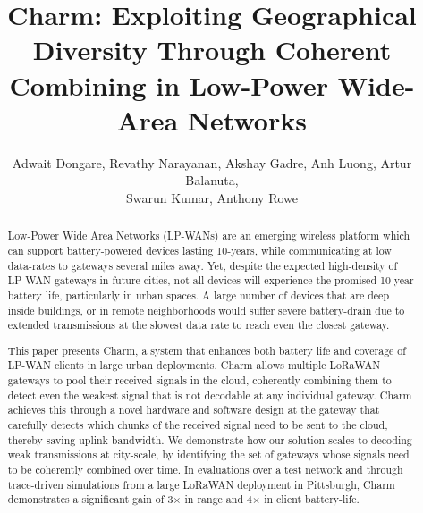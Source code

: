 \documentclass[sigconf]{acmart}
\title{Charm: Exploiting Geographical Diversity Through Coherent Combining in
Low-Power Wide-Area Networks}
\author{Adwait Dongare,
		Revathy Narayanan,
		Akshay Gadre,
		Anh Luong,
		Artur Balanuta,\\
		Swarun Kumar,
		Anthony Rowe}
\affiliation{%
 \institution{Carnegie Mellon University}
 \department{Electrical and Computer Engineering}
 \city{Pittsburgh} 
 \state{Pennsylvania} 
}
\begin{document}
\begin{abstract}


Low-Power Wide Area Networks (LP-WANs) are an emerging wireless platform which
can support battery-powered devices lasting 10-years, while communicating at
low data-rates to gateways several miles away. Yet, despite the expected
high-density of LP-WAN gateways in future cities, not all devices will
experience the promised 10-year battery life, particularly in urban spaces. A
large number of devices that are deep inside buildings, or in remote
neighborhoods would suffer severe battery-drain due to extended transmissions
at the slowest data rate to reach even the closest gateway.

This paper presents Charm, a system that enhances both battery life and
coverage of LP-WAN clients in large urban deployments. Charm allows multiple
LoRaWAN gateways to pool their received signals in the cloud, coherently
combining them to detect even the weakest signal that is not decodable at any
individual gateway. Charm achieves this through a novel hardware and software
design at the gateway that carefully detects which chunks of the received
signal need to be sent to the cloud, thereby saving uplink bandwidth. We
demonstrate how our solution scales to decoding weak transmissions at
city-scale, by identifying the set of gateways whose signals need to be
coherently combined over time. In evaluations over a test network and through
trace-driven simulations from a large LoRaWAN deployment in Pittsburgh, Charm
demonstrates a significant gain of 3$\times$ in range and 4$\times$ in client
battery-life.


\end{abstract}
\end{document}
